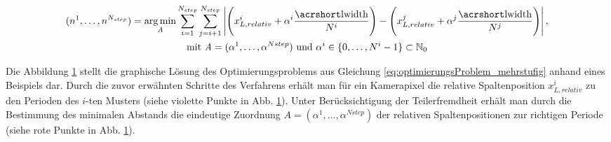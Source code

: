 %
\begin{equation}\label{eq:optimierungsProblem_mehrstufig}
	\begin{gathered}	
		(n^1,\ldots, n^{N_{step}}) = \argmin_{\mathrm{\textit{A}}}
		\sum\limits_{i = 1}^{N_{step}}
		\sum\limits_{j = i + 1}^{N_{step}}
		\left\lvert
			\Bigg(
				x_{L,relativ}^i + \alpha^i \dfrac{\acrshortmath{lwidth}}{N^i}
			\Bigg)
			-
			\Bigg(		
				x_{L,relativ}^j + \alpha^j \dfrac{\acrshortmath{lwidth}}{N^j}
			\Bigg)
		\right\rvert,\\
		\text{mit} ~\mathrm{\textit{A}} = (\alpha^1,\ldots,\alpha^{N{step}}) ~\text{und} ~\alpha^i \in \lbrace 0,\ldots, N^i - 1 \rbrace \subset \mathbb{N}_0
	\end{gathered}
\end{equation}

{
	\begin{figure}[H]
		\centering
		
		\label{tikz:abbBestimmungEindeutigerPosition}
	\end{figure}
}

\noindent
Die Abbildung \ref{tikz:abbBestimmungEindeutigerPosition} stellt die graphische Lösung des Optimierungsproblems aus Gleichung \ref{eq:optimierungsProblem_mehrstufig} anhand eines Beispiels dar.
Durch die zuvor erwähnten Schritte des Verfahrens erhält man für ein Kamerapixel die relative Spaltenposition $x_{L,relativ}^i$ zu den Perioden des $i$-ten Musters (siehe violette Punkte in Abb. \ref{tikz:abbBestimmungEindeutigerPosition}).
Unter Berücksichtigung der Teilerfremdheit erhält man durch die Bestimmung des minimalen Abstands die eindeutige Zuordnung $\mathrm{\textit{A}} = (\alpha^1,\ldots,\alpha^{N{step}})$ der relativen Spaltenpositionen zur richtigen Periode (siehe rote Punkte in Abb. \ref{tikz:abbBestimmungEindeutigerPosition}).

